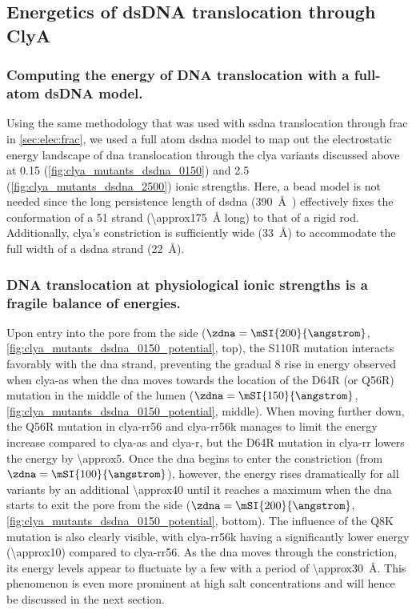 %
\subsection{Energetics of {dsDNA} translocation through {ClyA}}
%
\label{sec:elec:clya:dna}

\subsubsection{Computing the energy of DNA translocation with a full-atom {dsDNA} model.}
%

Using the same methodology that was used with \gls{ssdna} translocation through \gls{frac} in
\cref{sec:elec:frac}, we used a full atom \gls{dsdna} model to map out the electrostatic energy landscape of
\gls{dna} translocation through the \gls{clya} variants discussed above at \SI{0.15}{\Molar}
(\cref{fig:clya_mutants_dsdna_0150}) and \SI{2.5}{\Molar} (\cref{fig:clya_mutants_dsdna_2500}) ionic
strengths. Here, a bead model is not needed since the long persistence length of \gls{dsdna}
(\SI{390}{\angstrom}~\cite{Gross-2011}) effectively fixes the conformation of a \SI{51}{\bp} strand
(\SI{\approx175}{\angstrom} long) to that of a rigid rod. Additionally, \gls{clya}'s \transi{} constriction is
sufficiently wide (\SI{33}{\angstrom}) to accommodate the full width of a \gls{dsdna} strand
(\SI{22}{\angstrom}).

\subsubsection{DNA translocation at physiological ionic strengths is a fragile balance of energies.}
%

Upon entry into the pore from the \cisi{} side ($\zdna = \mSI{200}{\angstrom}$,
\cref{fig:clya_mutants_dsdna_0150_potential}, top), the S110R mutation interacts favorably with the \gls{dna}
strand, preventing the gradual \SI{+8}{\kT} rise in energy observed when \gls{clya-as} when the \gls{dna}
moves towards the location of the  D64R (or Q56R) mutation in the middle of the lumen ($\zdna =
\mSI{150}{\angstrom}$, \cref{fig:clya_mutants_dsdna_0150_potential}, middle). When moving further down, the
Q56R mutation in \gls{clya-rr56} and \gls{clya-rr56k} manages to limit the energy increase compared to
\gls{clya-as} and \gls{clya-r}, but the D64R mutation in \gls{clya-rr} lowers the energy by
\SI{\approx5}{\kT}. Once the \gls{dna} begins to enter the constriction (from $\zdna = \mSI{100}{\angstrom}$),
however, the energy rises dramatically for all variants by an additional \SI{\approx40}{\kT} until it reaches
a maximum when the \gls{dna} starts to exit the pore from the \transi{} side ($\zdna = \mSI{200}{\angstrom}$,
\cref{fig:clya_mutants_dsdna_0150_potential}, bottom). The influence of the Q8K mutation is also clearly
visible, with \gls{clya-rr56k} having a significantly lower energy (\SI{\approx10}{\kT}) compared to
\gls{clya-rr56}. As the \gls{dna} moves through the constriction, its energy levels appear to fluctuate by a
few \si{\kT} with a period of \SI{\approx30}{\angstrom}. This phenomenon is even more prominent at high salt
concentrations and will hence be discussed in the next section. 


